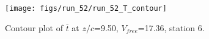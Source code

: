 \begin{figure}[H]
\centering
\texttt{[image: figs/run\_52/run\_52\_T\_contour]}
\caption{Contour plot of $\overline{t}$ at $z/c$=9.50, $V_{free}$=17.36, station 6.}
\end{figure}



